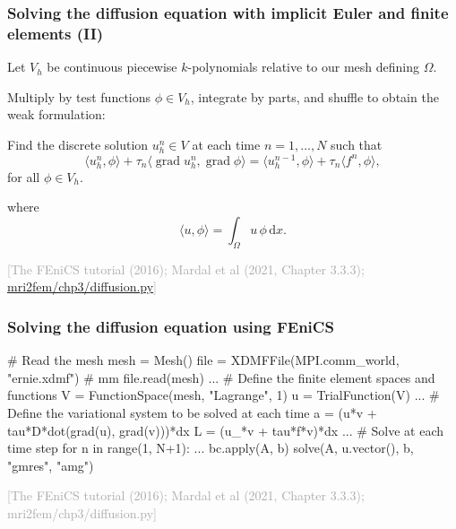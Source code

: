 \documentclass[mathserif, aspectratio=169]{beamer}
\DeclareMathOperator{\Grad}{\mathrm{grad}}
\newcommand{\inner}[2]{\langle #1,  #2\rangle}
\newcommand{\refer}[1]{\begin{flushright}{\tiny \textcolor{darkgray}{[#1]}}\end{flushright}}
\newcommand{\dx}{\, \mathrm{d}x}
\begin{document}
\begin{frame}
  \frametitle{Solving the diffusion equation with implicit Euler and finite elements (II)}

  Let $V_h$ be continuous piecewise $k$-polynomials relative to
  our mesh defining $\Omega$.

  \bigskip

  Multiply by test functions $\phi \in V_h$, integrate by parts, and
  shuffle to obtain the weak formulation:

  \bigskip
  
  Find the discrete solution $u_h^n \in V$ at each time $n = 1, \dots,
  N$ such that
  \begin{equation*}
    \inner{u_h^n}{\phi} + \tau_n \inner{\Grad u_h^n}{\Grad \phi}
    =  \inner{u_h^{n-1}}{\phi} + \tau_n \inner{f^n}{\phi},  
  \end{equation*}
  for all $\phi \in V_h$.
  
  \bigskip
  
  where
  \begin{equation*}
    \inner{u}{\phi} = \int_{\Omega} u \, \phi \dx.
  \end{equation*}
    \refer{The FEniCS tutorial (2016); Mardal et al (2021, Chapter 3.3.3); \href{https://github.com/kent-and/mri2fem/blob/master/mri2fem/mri2fem/chp3/diffusion.py}{mri2fem/chp3/diffusion.py}}
\end{frame}

\begin{frame}[fragile]
\frametitle{Solving the diffusion equation using FEniCS}

  \begin{python}
# Read the mesh
mesh = Mesh()
file = XDMFFile(MPI.comm_world, "ernie.xdmf") # mm 
file.read(mesh)
...
# Define the finite element spaces and functions
V = FunctionSpace(mesh, "Lagrange", 1)
u = TrialFunction(V)
...
# Define the variational system to be solved at each time
a = (u*v + tau*D*dot(grad(u), grad(v)))*dx
L = (u_*v + tau*f*v)*dx
...
# Solve at each time step
for n in range(1, N+1):
    ...
    bc.apply(A, b)
    solve(A, u.vector(), b, "gmres", "amg")
  \end{python}
  \vspace{-1em}
  \refer{The FEniCS tutorial (2016); Mardal et al (2021, Chapter 3.3.3); mri2fem/chp3/diffusion.py}

\end{frame}
\end{document}
